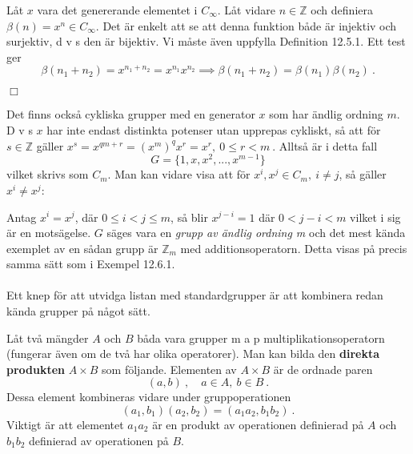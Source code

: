 \documentclass{article}
\begin{document}
Låt $x$ vara det genererande elementet i $C_{\infty}$. Låt vidare $n\in\mathbb{Z}$ och definiera $\beta(n)=x^n\in C_{\infty}$. Det är enkelt att se att denna funktion både är injektiv och surjektiv, d v s den är bijektiv. Vi måste även uppfylla Definition 12.5.1. Ett test ger
$$
\beta(n_1+n_2)=x^{n_1+n_2}=x^{n_1}x^{n_2}\implies \beta(n_1+n_2)=\beta(n_1)\beta(n_2) \ .
$$
\begin{flushright}
$\Box$
\end{flushright}
Det finns också cykliska grupper med en generator $x$ som har ändlig ordning $m$. D v s $x$ har inte endast distinkta potenser utan upprepas cykliskt, så att för $s\in\mathbb{Z}$ gäller $x^s=x^{qm+r}=(x^m)^qx^r=x^r, \ 0\leq r< m \ .$ Alltså är i detta fall
$$
G=\{1,x,x^2,...,x^{m-1}\}
$$
vilket skrivs som $C_m$. Man kan vidare visa att för $x^i,x^j\in C_m, \ i\neq j$, så gäller $x^i\neq x^j$:

Antag $x^i=x^j$, där $0\leq i<j\leq m$, så blir $x^{j-i}=1$ där $0<j-i<m$ vilket i sig är en motsägelse. $G$ säges vara en \textit{grupp av ändlig ordning m} och det mest kända exemplet av en sådan grupp är $\mathbb{Z}_m$ med additionsoperatorn. Detta visas på precis samma sätt som i Exempel 12.6.1.\\ \\ 
Ett knep för att utvidga listan med standardgrupper är att kombinera redan kända grupper på något sätt. 

Låt två mängder $A$ och $B$ båda vara grupper m a p multiplikationsoperatorn (fungerar även om de två har olika operatorer). Man kan bilda den \textbf{direkta produkten} $A\times B$ som följande. Elementen av $A\times B$ är de ordnade paren 
$$
(a,b) \ , \quad a\in A, \ b\in B \ .
$$
Dessa element kombineras vidare under gruppoperationen
$$
(a_1,b_1)(a_2,b_2)=(a_1a_2,b_1b_2) \ .
$$
Viktigt är att elementet $a_1a_2$ är en produkt av operationen definierad på $A$ och $b_1b_2$ definierad av operationen på $B$. 
\end{document}
